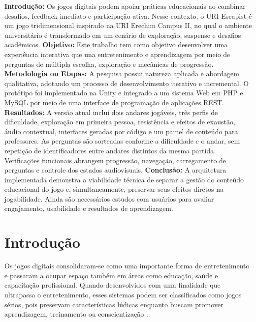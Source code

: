 \documentclass[12pt]{article}
\begin{document}
\begin{resumo}
\textbf{Introdução:} Os jogos digitais podem apoiar práticas educacionais ao combinar desafios, feedback imediato e participação ativa. Nesse contexto, o URI Escapist é um jogo tridimensional inspirado na URI Erechim Campus II, no qual o ambiente universitário é transformado em um cenário de exploração, suspense e desafios acadêmicos.
\textbf{Objetivo:} Este trabalho tem como objetivo desenvolver uma experiência interativa que una entretenimento e aprendizagem por meio de perguntas de múltipla escolha, exploração e mecânicas de progressão.
\textbf{Metodologia ou Etapas:} A pesquisa possui natureza aplicada e abordagem qualitativa, adotando um processo de desenvolvimento iterativo e incremental. O protótipo foi implementado na Unity e integrado a um sistema Web em PHP e MySQL por meio de uma interface de programação de aplicações REST.
\textbf{Resultados:} A versão atual inclui dois andares jogáveis, três perfis de dificuldade, exploração em primeira pessoa, resistência e efeitos de exaustão, áudio contextual, interfaces geradas por código e um painel de conteúdo para professores. As perguntas são sorteadas conforme a dificuldade e o andar, sem repetição de identificadores entre andares distintos da mesma partida. Verificações funcionais abrangem progressão, navegação, carregamento de perguntas e controle dos estados audiovisuais.
\textbf{Conclusão:} A arquitetura implementada demonstra a viabilidade técnica de separar a gestão do conteúdo educacional do jogo e, simultaneamente, preservar seus efeitos diretos na jogabilidade. Ainda são necessários estudos com usuários para avaliar engajamento, usabilidade e resultados de aprendizagem.
\end{resumo}


\section{Introdução}

Os jogos digitais consolidaram-se como uma importante forma de entretenimento e passaram a ocupar espaço também em áreas como educação, saúde e capacitação profissional. Quando desenvolvidos com uma finalidade que ultrapassa o entretenimento, esses sistemas podem ser classificados como jogos sérios, pois preservam características lúdicas enquanto buscam promover aprendizagem, treinamento ou conscientização \cite{abt1970,michael2006}.
\end{document}
